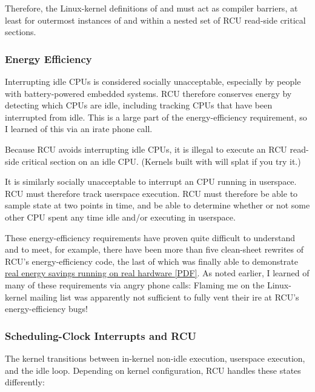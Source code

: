 Therefore, the Linux-kernel definitions of  and
 must act as compiler barriers, at least for outermost
instances of  and  within a nested set
of RCU read-side critical sections.


\subsubsection{Energy Efficiency}

Interrupting idle CPUs is considered socially unacceptable, especially
by people with battery-powered embedded systems.
RCU therefore conserves
energy by detecting which CPUs are idle, including tracking CPUs that
have been interrupted from idle.
This is a large part of the
energy-efficiency requirement, so I learned of this via an irate phone
call.

Because RCU avoids interrupting idle CPUs, it is illegal to execute an
RCU read-side critical section on an idle CPU.
(Kernels built with
 will splat if you try it.)

It is similarly socially unacceptable to interrupt an  CPU
running in userspace.
RCU must therefore track  userspace
execution.
RCU must therefore be able to sample state at two points in
time, and be able to determine whether or not some other CPU spent any
time idle and/or executing in userspace.

These energy-efficiency requirements have proven quite difficult to
understand and to meet, for example, there have been more than five
clean-sheet rewrites of RCU's energy-efficiency code, the last of which
was finally able to demonstrate
\href{http://www.rdrop.com/users/paulmck/realtime/paper/AMPenergy.2013.04.19a.pdf}{real energy savings running on real hardware [PDF]}.
As noted earlier, I learned of many of these requirements via angry
phone calls:
Flaming me on the Linux-kernel mailing list was apparently
not sufficient to fully vent their ire at RCU's energy-efficiency bugs!


\subsubsection{Scheduling-Clock Interrupts and RCU}

The kernel transitions between in-kernel non-idle execution, userspace
execution, and the idle loop.
Depending on kernel configuration, RCU
handles these states differently:

